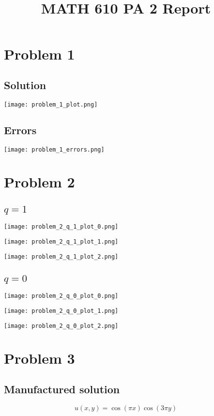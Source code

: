 \documentclass{report}
\title{MATH 610 PA 2 Report}
\author{}
\date{}
\begin{document}
\maketitle

\chapter*{Problem 1}
\section*{Solution}
\texttt{[image: problem\_1\_plot.png]}

\section*{Errors}
\texttt{[image: problem\_1\_errors.png]}


\chapter*{Problem 2}
\section*{$q=1$}
\texttt{[image: problem\_2\_q\_1\_plot\_0.png]}

\texttt{[image: problem\_2\_q\_1\_plot\_1.png]}

\texttt{[image: problem\_2\_q\_1\_plot\_2.png]}

\section*{$q=0$}
\texttt{[image: problem\_2\_q\_0\_plot\_0.png]}

\texttt{[image: problem\_2\_q\_0\_plot\_1.png]}

\texttt{[image: problem\_2\_q\_0\_plot\_2.png]}

\chapter*{Problem 3}
\section*{Manufactured solution}
\[u(x,y) = \cos(\pi x)\cos(3\pi y)\]
\end{document}
